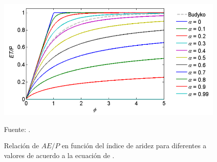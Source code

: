 \begin{figure}[ht!]
	\includegraphics[scale=.57]{Images/budyko01.png}
	\centering
	\caption{Relación de $AE/P$ en función del índice de aridez para diferentes a valores de acuerdo a la ecuación de \citet{Fu1981}.}
	Fuente: \citet{Krogh2011}.
	\label{fig:budyko01}
\end{figure}

 